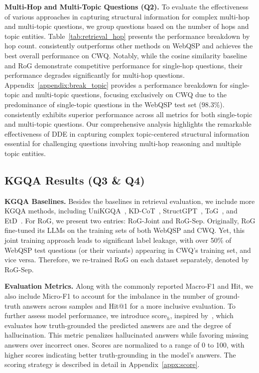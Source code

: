 \textbf{Multi-Hop and Multi-Topic Questions (\textbf{Q2}).} To evaluate the effectiveness of various approaches in capturing structural information for complex multi-hop and multi-topic questions, we group questions based on the number of hops and topic entities. Table~\ref{tab:retrieval_hop} presents the performance breakdown by hop count. \proj consistently outperforms other methods on WebQSP and achieves the best overall performance on CWQ. Notably, while the cosine similarity baseline and RoG demonstrate competitive performance for single-hop questions, their performance degrades significantly for multi-hop questions. Appendix~\ref{appendix:break_topic} provides a performance breakdown for single-topic and multi-topic questions, focusing exclusively on CWQ due to the predominance of single-topic questions in the WebQSP test set ($98.3\%$). \proj consistently exhibits superior performance across all metrics for both single-topic and multi-topic questions. Our comprehensive analysis highlights the remarkable effectiveness of DDE in capturing complex topic-centered structural information essential for challenging questions involving multi-hop reasoning and multiple topic entities.

\subsection{KGQA Results (\textbf{Q3} \& \textbf{Q4})}
\label{sec:kgqa}

\textbf{KGQA Baselines.} Besides the baselines in retrieval evaluation, we include more KGQA methods, including UniKGQA~\citep{jiang2023unikgqa}, KD-CoT~\citep{wang2023knowledge}, StructGPT~\citep{jiang2023structgpt}, ToG~\citep{sun2024think}, and EtD~\citep{liu2024explore}. 
For RoG, we present two entries: RoG-Joint and RoG-Sep. Originally, RoG fine-tuned its LLMs on the training sets of both WebQSP and CWQ. Yet, this joint training approach leads to significant label leakage, with over 50\% of WebQSP test questions (or their variants) appearing in CWQ's training set, and vice versa. Therefore, we re-trained RoG on each dataset separately, denoted by RoG-Sep.

\textbf{Evaluation Metrics.} 
Along with the commonly reported Macro-F1 and Hit, we also include Micro-F1 to account for the imbalance in the number of ground-truth answers across samples and Hit@1 for a more inclusive evaluation. To further assess model performance, we introduce score$_h$, inspired by~\citep{yang2024crag}, which evaluates how truth-grounded the predicted answers are and the degree of hallucination. This metric penalizes hallucinated answers while favoring missing answers over incorrect ones. Scores are normalized to a range of 0 to 100, with higher scores indicating better truth-grounding in the model’s answers. The scoring strategy is described in detail in Appendix~\ref{appx:score}.

